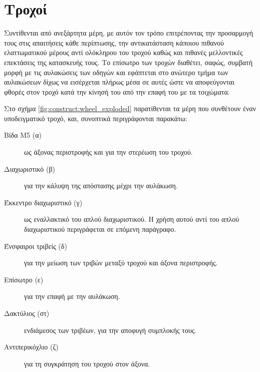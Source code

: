 \section{Τροχοί}

Συντίθενται από ανεξάρτητα μέρη, με αυτόν τον τρόπο επιτρέποντας την προσαρμογή
τους στις απαιτήσεις κάθε περίπτωσης, την αντικατάσταση κάποιου πιθανού
ελαττωματικού μέρους αντί ολόκληρου του τροχού καθώς και πιθανές μελλοντικές
επεκτάσεις της κατασκευής τους.
Το επίσωτρο των τροχών διαθέτει, σαφώς, συμβατή μορφή με τις αυλακώσεις των
οδηγών και εφάπτεται στο ανώτερο τμήμα των αυλακώσεων δίχως να εισέρχεται πλήρως
μέσα σε αυτές ώστε να αποφεύγονται φθορές στον τροχό κατά την κίνησή του από την
επαφή του με τα τοιχώματα.

Στο σχήμα \ref{fig:construct:wheel_exploded} παρατίθενται τα μέρη που συνθέτουν
έναν υποδειγματικό τροχό, και, συνοπτικά περιγράφονται παρακάτω:
\begin{flushleft}
\begin{description}
    \item[Βίδα M5 (α)] ως άξονας περιστροφής και για την στερέωση του τροχού.
    \item[Διαχωριστικό (β)] για την κάλυψη της απόστασης μέχρι την αυλάκωση.
    \item[Έκκεντρο διαχωριστικό (γ)] ως εναλλακτικό του απλού διαχωριστικού. Η
    χρήση αυτού αντί του απλού διαχωριστικού περιγράφεται σε επόμενη παράγραφο.
    \item[Ένσφαιροι τριβείς (δ)] για την μείωση των τριβών μεταξύ τροχού και
    άξονα περιστροφής.
    \item[Επίσωτρο (ε)] για την επαφή με την αυλάκωση.
    \item[Δακτύλιος (στ)] ενδιάμεσος των τριβέων, για την αποφυγή συμπλοκής
    τους.
    \item[Αντιπερικόχλιο (ζ)] για τη συγκράτηση του τροχού στον άξονα.
\end{description}
\end{flushleft}

